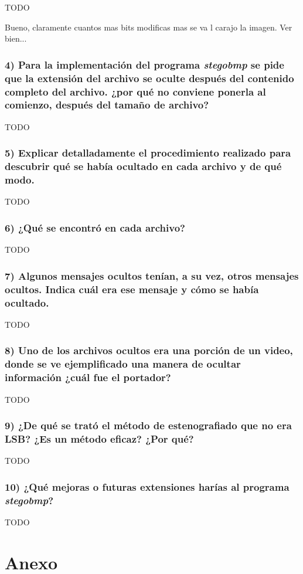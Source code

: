 \documentclass[a4paper,10pt]{article}
\begin{document}
TODO

Bueno, claramente cuantos mas bits modificas mas se va l carajo la imagen. Ver bien...

\subsubsection*{ 4) Para la implementación del programa \textit{stegobmp} se pide que la extensión del archivo se oculte
después del contenido completo del archivo. ¿por qué no conviene ponerla al comienzo, después del tamaño de archivo?}

TODO

\subsubsection*{ 5) Explicar detalladamente el procedimiento realizado para descubrir qué se había ocultado en
cada archivo y de qué modo.}

TODO

\subsubsection*{ 6) ¿Qué se encontró en cada archivo?}

TODO

\subsubsection*{ 7) Algunos mensajes ocultos tenían, a su vez, otros mensajes ocultos. Indica cuál era ese mensaje
y cómo se había ocultado.}

TODO

\subsubsection*{ 8) Uno de los archivos ocultos era una porción de un video, donde se ve ejemplificado una manera
de ocultar información ¿cuál fue el portador?}

TODO

\subsubsection*{ 9) ¿De qué se trató el método de estenografiado que no era LSB? ¿Es un método eficaz? ¿Por qué?}

TODO

\subsubsection*{ 10) ¿Qué mejoras o futuras extensiones harías al programa \textit{stegobmp}?}

TODO

\clearpage
\appendix
\section{Anexo}
\end{document}
